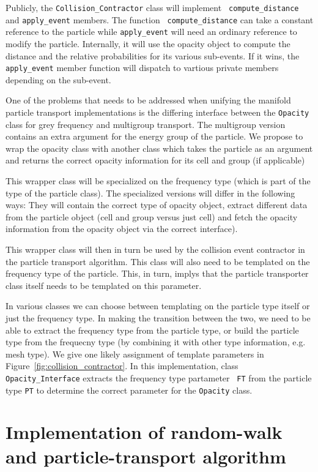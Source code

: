 \documentclass[memo]{ResearchNote}
\begin{document}
Publicly, the  {\tt  Collision\_Contractor}  class will implement  {\tt
  compute\_distance} and  {\tt apply\_event} members.  The function {\tt
  compute\_distance} can take    a constant reference to  the  particle
while {\tt apply\_event} will need an ordinary  reference to modify the
particle.  Internally,  it will use  the opacity object to compute the
distance and the  relative probabilities for  its various sub-events. 
If it wins, the {\tt apply\_event} member function will dispatch to
vartious private members depending on the sub-event.

One of the problems that needs to be addressed when unifying the
manifold particle transport implementations is the differing interface
between the {\tt Opacity} class for grey frequency and multigroup
transport. The multigroup version contains an extra argument for the
energy group of the particle. We propose to wrap the opacity class
with another class which takes the particle as an argument and returns
the correct opacity information for its cell and group (if
applicable)

This wrapper class will be specialized on the frequency type (which is
part of the type of the particle class). The specialized versions will
differ in the following ways: They will contain the correct type of
opacity object, extract different data from the particle object (cell
and group versus just cell) and fetch the opacity information from the
opacity object via the correct interface).

This wrapper class will then in turn be used by the collision event
contractor in the particle transport algorithm. This class will also
need to be templated on the frequency type of the particle. This, in
turn, implys that the particle transporter class itself needs to be
templated on this parameter.

In various classes we can choose between templating on the particle
type itself or just the frequency type. In making the transition
between the two, we need to be able to extract the frequency type from
the particle type, or build the particle type from the frequecny type
(by combining it with other type information, e.g. mesh type). We give
one likely assignment of template parameters in
Figure~\ref{fig:collision_contractor}. In this implementation, class
{\tt Opacity\_Interface} extracts the frequency type partameter {\tt
  FT} from the particle type {\tt PT} to determine the correct
parameter for the {\tt Opacity} class. 

\section{Implementation of random-walk and particle-transport algorithm}
\end{document}
